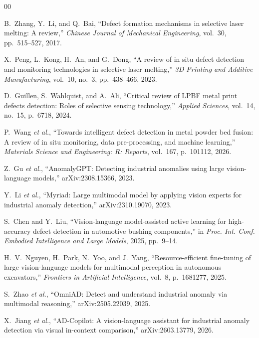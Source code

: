 \begin{thebibliography}{00}

B.~Zhang, Y.~Li, and Q.~Bai, ``Defect formation mechanisms in selective laser melting: A review,'' \emph{Chinese Journal of Mechanical Engineering}, vol.~30, pp.~515--527, 2017.

X.~Peng, L.~Kong, H.~An, and G.~Dong, ``A review of in situ defect detection and monitoring technologies in selective laser melting,'' \emph{3D Printing and Additive Manufacturing}, vol.~10, no.~3, pp.~438--466, 2023.

D.~Guillen, S.~Wahlquist, and A.~Ali, ``Critical review of LPBF metal print defects detection: Roles of selective sensing technology,'' \emph{Applied Sciences}, vol.~14, no.~15, p.~6718, 2024.

P.~Wang \emph{et al.}, ``Towards intelligent defect detection in metal powder bed fusion: A review of in situ monitoring, data pre-processing, and machine learning,'' \emph{Materials Science and Engineering: R: Reports}, vol.~167, p.~101112, 2026.

Z.~Gu \emph{et al.}, ``AnomalyGPT: Detecting industrial anomalies using large vision-language models,'' arXiv:2308.15366, 2023.

Y.~Li \emph{et al.}, ``Myriad: Large multimodal model by applying vision experts for industrial anomaly detection,'' arXiv:2310.19070, 2023.

S.~Chen and Y.~Liu, ``Vision-language model-assisted active learning for high-accuracy defect detection in automotive bushing components,'' in \emph{Proc. Int. Conf. Embodied Intelligence and Large Models}, 2025, pp.~9--14.

H.~V.~Nguyen, H.~Park, N.~Yoo, and J.~Yang, ``Resource-efficient fine-tuning of large vision-language models for multimodal perception in autonomous excavators,'' \emph{Frontiers in Artificial Intelligence}, vol.~8, p.~1681277, 2025.

S.~Zhao \emph{et al.}, ``OmniAD: Detect and understand industrial anomaly via multimodal reasoning,'' arXiv:2505.22039, 2025.

X.~Jiang \emph{et al.}, ``AD-Copilot: A vision-language assistant for industrial anomaly detection via visual in-context comparison,'' arXiv:2603.13779, 2026.


\end{thebibliography}
